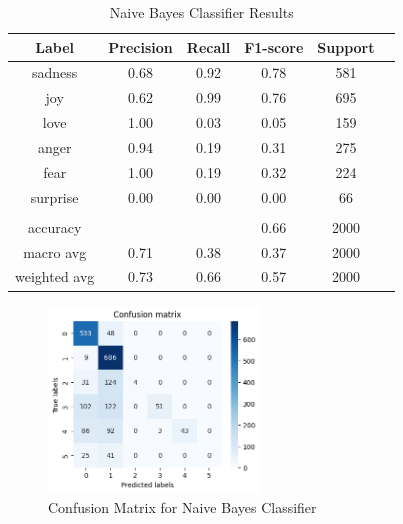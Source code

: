 \documentclass{article}
\begin{document}
\begin{table}[h]
    \label{table:nb_results_1}
\centering
\begin{tabular}{|c|c|c|c|c|c|}
\hline
\textbf{Label} & \textbf{Precision} & \textbf{Recall} & \textbf{F1-score} & \textbf{Support} \\ \hline
sadness        & 0.68               & 0.92            & 0.78              & 581              \\ \hline
joy            & 0.62               & 0.99            & 0.76              & 695              \\ \hline
love           & 1.00               & 0.03            & 0.05              & 159              \\ \hline
anger          & 0.94               & 0.19            & 0.31              & 275              \\ \hline
fear           & 1.00               & 0.19            & 0.32              & 224              \\ \hline
surprise       & 0.00               & 0.00            & 0.00              & 66               \\ \hline
 &  &  &  &  \\ \hline
accuracy       &                     &                 & 0.66              & 2000             \\ \hline
macro avg      & 0.71               & 0.38            & 0.37              & 2000             \\ \hline
weighted avg   & 0.73               & 0.66            & 0.57              & 2000             \\ \hline
\end{tabular}
\bigskip
\caption{Naive Bayes Classifier Results}
\end{table}

\begin{figure}[h]
    \label{fig:nb_confusion_matrix_1}
    \centering
    \includegraphics[width=0.5\textwidth]{confusion_matrix_2_nb.png}
    \caption{Confusion Matrix for Naive Bayes Classifier}
\end{figure}
\end{document}
